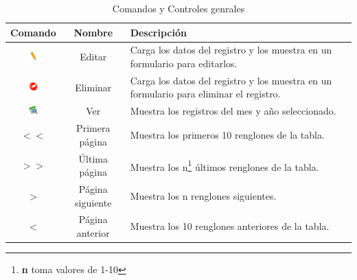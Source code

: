 \begin{table}[h!]
	\centering
	\begin{tabular}{|c|c|l|}
		\hline
		\textbf{Comando} & \textbf{Nombre} & \textbf{Descripción}\\
		\hline
		\includegraphics[height=10pt]{images/icons/editar.png} & Editar & Carga los datos del registro y los muestra en un formulario para editarlos.\\
		\hline
		\includegraphics[height=10pt]{images/icons/eliminar.png} & Eliminar & Carga los datos del registro y los muestra en un formulario para eliminar el registro.\\
		\hline
		\includegraphics[height=10pt]{images/icons/ver.png} & Ver & Muestra los registros del mes y año seleccionado.\\
		\hline
		$<<$& Primera página & Muestra los primeros 10 renglones de la tabla.\\
 		\hline
		$>>$& Última página & Muestra los n\footnote{\textbf{n} toma valores de 1-10} últimos renglones de la tabla.\\
 		\hline
		$>$& Página siguiente & Muestra los n renglones siguientes.\\
 		\hline
		$<$& Página anterior & Muestra los 10 renglones anteriores de la tabla.\\
 		\hline
	\end{tabular}
	\caption{Comandos y Controles genrales}
\end{table}